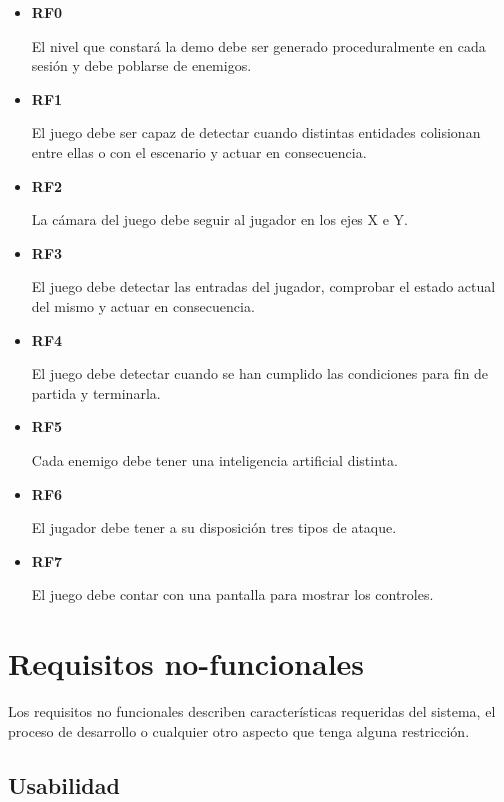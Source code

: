 	\begin{itemize}
			\item \textbf{RF0}
				
			El nivel que constará la demo debe ser generado proceduralmente en cada sesión y debe poblarse de enemigos.
			
			\item \textbf{RF1}
				
			El juego debe ser capaz de detectar cuando distintas entidades colisionan entre ellas o con el escenario y actuar en consecuencia.

			\item \textbf{RF2}
				
			La cámara del juego debe seguir al jugador en los ejes X e Y.

			\item \textbf{RF3}
				
			El juego debe detectar las entradas del jugador, comprobar el estado actual del mismo y actuar en consecuencia.

			\item \textbf{RF4}
				
			El juego debe detectar cuando se han cumplido las condiciones para fin de partida y terminarla.

			\item \textbf{RF5}
				
			Cada enemigo debe tener una inteligencia artificial distinta.

			\item \textbf{RF6}
				
			El jugador debe tener a su disposición tres tipos de ataque.

			\item \textbf{RF7}
				
			El juego debe contar con una pantalla para mostrar los controles.
	\end{itemize}

\section{Requisitos no-funcionales}
	
	Los requisitos no funcionales describen características requeridas del sistema, el proceso de desarrollo o cualquier otro aspecto que tenga alguna restricción.

	\subsection{Usabilidad}

